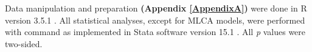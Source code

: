 Data manipulation and preparation \textbf{(Appendix \ref{AppendixA})} were done in R version 3.5.1 \parencite{R3.5.1}. All statistical analyses, except for MLCA models, were performed with  command as implemented in Stata software version 15.1 \parencite{stata15}. All \textit{p} values were two-sided.
